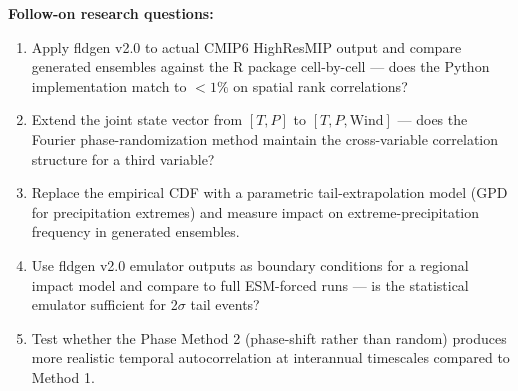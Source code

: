 \documentclass[11pt]{article}
\begin{document}
\noindent\textbf{Follow-on research questions:}
\begin{enumerate}[leftmargin=1.6em,itemsep=0.2em,topsep=0.2em,label=Q\arabic*.]
\item Apply fldgen v2.0 to actual CMIP6 HighResMIP output and compare generated ensembles against the R package cell-by-cell --- does the Python implementation match to $<1\%$ on spatial rank correlations?
\item Extend the joint state vector from $[T, P]$ to $[T, P, \mathrm{Wind}]$ --- does the Fourier phase-randomization method maintain the cross-variable correlation structure for a third variable?
\item Replace the empirical CDF with a parametric tail-extrapolation model (GPD for precipitation extremes) and measure impact on extreme-precipitation frequency in generated ensembles.
\item Use fldgen v2.0 emulator outputs as boundary conditions for a regional impact model and compare to full ESM-forced runs --- is the statistical emulator sufficient for 2$\sigma$ tail events?
\item Test whether the Phase Method 2 (phase-shift rather than random) produces more realistic temporal autocorrelation at interannual timescales compared to Method 1.
\end{enumerate}
\end{document}
